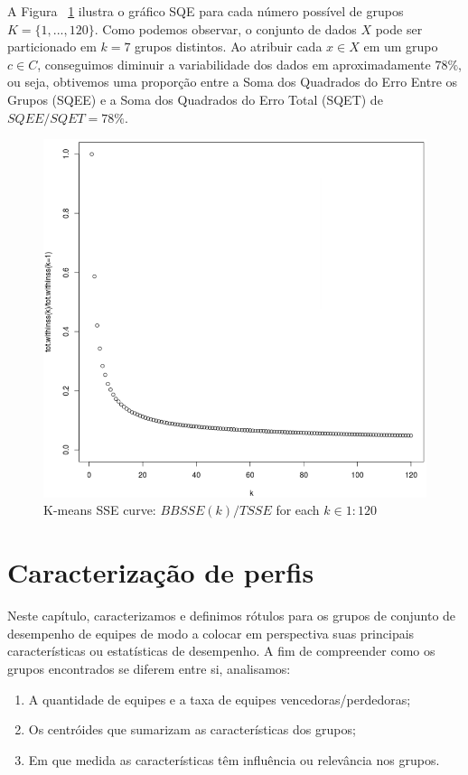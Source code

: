A Figura ~\ref{fig:k-means-curve} ilustra o gráfico SQE para cada número possível de grupos $K = \{1, ..., 120\}$. Como podemos observar, o conjunto de dados $X$ pode ser particionado em $k=7$ grupos distintos. Ao atribuir cada $x \in X$ em um grupo $c \in C$, conseguimos diminuir a variabilidade dos dados em aproximadamente $78\%$, ou seja, obtivemos uma proporção entre a Soma dos Quadrados do Erro Entre os Grupos (SQEE) e a Soma dos Quadrados do Erro Total (SQET) de $SQEE/SQET = 78 \%$.

\begin{figure}
  \centering
  \includegraphics[width=1.0\textwidth]{k-means-curve}%
  \caption{K-means SSE curve: $BBSSE(k)/TSSE$   for each  $k \in {1:120}$}
  \label{fig:k-means-curve}
\end{figure}

\chapter{Caracterização de perfis}

Neste capítulo, caracterizamos e definimos rótulos para os grupos de conjunto de desempenho de equipes de modo a colocar em perspectiva suas principais características ou estatísticas de desempenho. A fim de compreender como os grupos encontrados se diferem entre si, analisamos:

\begin{enumerate}[label=(\roman*)]
 \item A quantidade de equipes e a taxa de equipes vencedoras/perdedoras;
 \item Os centróides que sumarizam as características dos grupos;
 \item Em que medida as características têm influência ou relevância nos grupos.
\end{enumerate}

